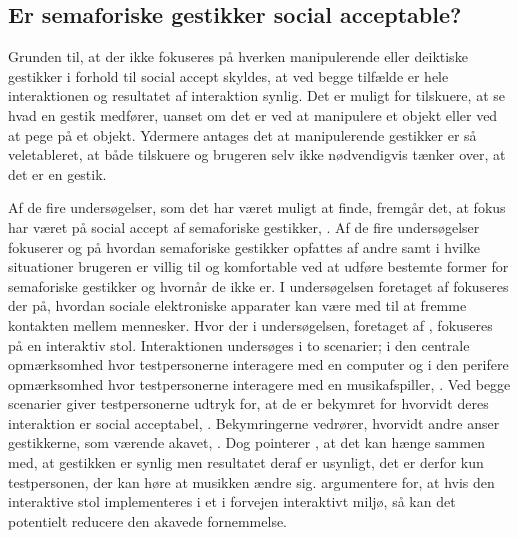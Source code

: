 \subsection{Er semaforiske gestikker social acceptable?}
\label{Socialaccept}
%            
Grunden til, at der ikke fokuseres på hverken manipulerende eller deiktiske gestikker i forhold til social accept skyldes, at ved begge tilfælde er hele interaktionen og resultatet af interaktion synlig. Det er muligt for tilskuere, at se hvad en gestik medfører, uanset om det er ved at manipulere et objekt eller ved at pege på et objekt. Ydermere antages det at manipulerende gestikker er så veletableret, at både tilskuere og brugeren selv ikke nødvendigvis tænker over, at det er en gestik. 

Af de fire undersøgelser, som det har været muligt at finde, fremgår det, at fokus har været på social accept af semaforiske gestikker, \parencite{PDF:AreYouComfortableDoingThat, PDF:WouldYouDoThat, PDF:AnExploratoryStudy, PDF:AChairAsUbiquitousInputDevice}. Af de fire undersøgelser fokuserer \textcite{PDF:AreYouComfortableDoingThat} og \textcite{PDF:WouldYouDoThat} på hvordan semaforiske gestikker opfattes af andre samt i hvilke situationer brugeren er villig til og komfortable ved at udføre bestemte former for semaforiske gestikker og hvornår de ikke er. I undersøgelsen foretaget af \textcite{PDF:AnExploratoryStudy} fokuseres der på, hvordan sociale elektroniske apparater kan være med til at fremme kontakten mellem mennesker. Hvor der i undersøgelsen, foretaget af \textcite{PDF:AChairAsUbiquitousInputDevice}, fokuseres på en interaktiv stol. Interaktionen undersøges i to scenarier; i den centrale opmærksomhed hvor testpersonerne interagere med en computer og i den perifere opmærksomhed hvor testpersonerne interagere med en musikafspiller, \parencite{PDF:AChairAsUbiquitousInputDevice}. Ved begge scenarier giver testpersonerne udtryk for, at de er bekymret for hvorvidt deres interaktion er social acceptabel, \parencite[s. 8]{PDF:AChairAsUbiquitousInputDevice}. Bekymringerne vedrører, hvorvidt andre anser gestikkerne, som værende akavet, \parencite[s. 4]{PDF:AChairAsUbiquitousInputDevice}. Dog pointerer \textcite[s. 9]{PDF:AChairAsUbiquitousInputDevice}, at det kan hænge sammen med, at gestikken er synlig men resultatet deraf er usynligt, det er derfor kun testpersonen, der kan høre at musikken ændre sig. \textcite[s. 9]{PDF:AChairAsUbiquitousInputDevice} argumentere for, at hvis den interaktive stol implementeres i et i forvejen interaktivt miljø, så kan det potentielt reducere den akavede fornemmelse.\blankline

